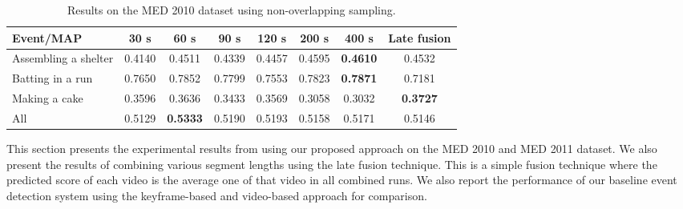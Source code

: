 \begin{table*}
	\renewcommand{\arraystretch}{1.3}
	\caption{Results on the MED 2010 dataset using non-overlapping sampling.}
	\label{t_med10_nonoverlapping}
	\centering
	\begin{tabular}{|l|cccccc|c|}
		\hline
		Event/MAP & 30 s & 60 s & 90 s & 120 s & 200 s & 400 s & Late fusion \\
		\hline
		Assembling a shelter&0.4140&0.4511&0.4339&0.4457&0.4595&\textbf{0.4610}&0.4532
		\\
		\hline
		Batting in a run&0.7650&0.7852&0.7799&0.7553&0.7823&\textbf{0.7871}&0.7181
		\\
		\hline
		Making a cake&0.3596&0.3636&0.3433&0.3569&0.3058&0.3032&\textbf{0.3727}
		\\
		\hline
		All&0.5129&\textbf{0.5333}&0.5190&0.5193&0.5158&0.5171&0.5146
		
		\\
		\hline
	\end{tabular}
\end{table*}
This section presents the experimental results from using our proposed approach on the MED 2010 and MED 2011 dataset. We also present the results of combining various segment lengths using the late fusion technique. This is a simple fusion technique where the predicted score of each video is the average one of that video in all combined runs. We also report the performance of our baseline event detection system using the keyframe-based and video-based approach for comparison.  

